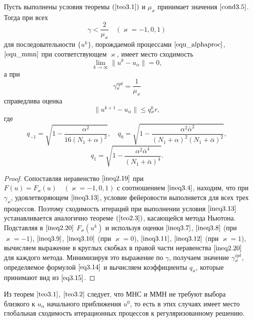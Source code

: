\begin{theorem}\label{teo3.2}
	Пусть выполнены условия теоремы $(\ref{teo3.1})$ и $\mu_\varkappa$ принимает значения $\eqref{cond3.5}$. Тогда при всех
	\begin{equation}\label{ineq3.13}
	\gamma <\frac{2}{\mu _\varkappa}\quad (\varkappa=-1,0,1)
	\end{equation}
	для последовательности $\{u^k\}$, порождаемой процессами $\eqref{equ_alphaproc}$, $\eqref{equ_mmn}$ при соответствующем $\varkappa$, имеет место сходимость $$\lim_{k\to\infty}\|u^k-u_\alpha\|=0,$$ а при 
	\begin{equation}\label{eq3.14}
	\gamma{_\varkappa^{opt}}=\frac{1}{\mu_\varkappa}
	\end{equation}
	справедлива оценка $$\|u^{k+1}-u_\alpha\|\le q{_\varkappa^k}r,$$ где
	$$q_{-1}=\sqrt{1-\frac{\alpha^2}{16(N_1+\alpha)^2}}, \quad q_0=\sqrt{1-\frac{\alpha^2\bar\alpha^2}{(N_1+\alpha)^2(N_1+\bar\alpha)^2}},$$
	\begin{equation}\label{eq3.15}
	q_1=\sqrt{1-\frac{\alpha^2\bar\alpha^4}{(N_1+\bar\alpha)^4}}.
	\end{equation}
\end{theorem}
\begin{proof} Сопоставляя неравенство $\eqref{ineq2.19}$ при $F(u)=F_\varkappa(u) \quad (\varkappa=-1,0,1)$ с соотношением $\eqref{ineq3.4}$, находим, что при $\gamma_\varkappa$, удовлетворяющем  $\eqref{ineq3.13}$, условие фейеровости выполняется для всех трех процессов. Поэтому сходимость итераций при выполнении условия $\eqref{ineq3.13}$ устанавливается аналогично теореме $(\ref{teo2.3})$, касающейся метода Ньютона. Подставляя в $\eqref{ineq2.20}$ $F_\varkappa(u^k)$ и используя оценки $\eqref{ineq3.7}$, $\eqref{ineq3.8}$ (при $\varkappa=-1$), $\eqref{ineq3.9}$, $\eqref{ineq3.10}$ (при $\varkappa=0$), $\eqref{ineq3.11}$, $\eqref{ineq3.12}$ (при $\varkappa=1$), вычисляем выражение в круглых скобках в правой части неравенства $\eqref{ineq2.20}$ для каждого метода. Минимизируя это выражение по $\gamma$, получаем значение $\gamma{_\varkappa^{opt}}$, определяемое формулой $\eqref{eq3.14}$ и вычисляем коэффициенты $q_\varkappa$, которые принимают вид из $\eqref{eq3.15}$.
\end{proof}

\begin{remark}
	Из теорем $\eqref{teo3.1}$, $\eqref{teo3.2}$ следует, что МНС и ММН не требуют выбора близкого к $u_\alpha$ начального приближения $u^0$, то есть в этих случаях имеет место глобальная сходимость итерационных процессов к регуляризованному решению.
\end{remark}

